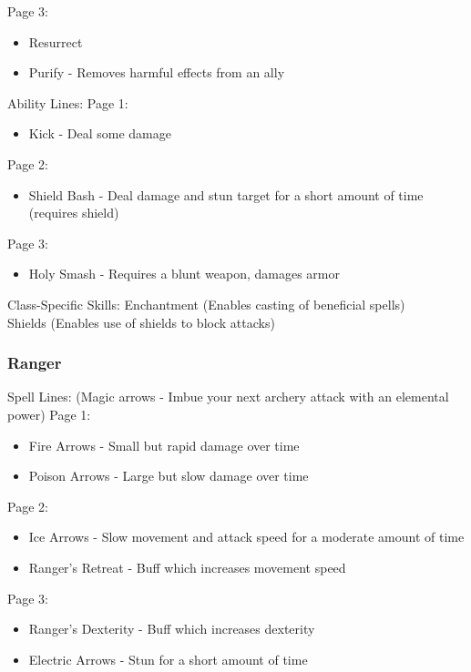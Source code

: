 \documentclass{article}
\begin{document}
Page 3:
\begin{itemize}
    \item Resurrect
    \item Purify - Removes harmful effects from an ally
\end{itemize}

Ability Lines:
Page 1:
\begin{itemize}
    \item Kick - Deal some damage
    
\end{itemize}

Page 2:
\begin{itemize}
    \item Shield Bash -  Deal damage and stun target for a short amount of time (requires shield)
    
\end{itemize}

Page 3:
\begin{itemize}
    \item Holy Smash - Requires a blunt weapon, damages armor
\end{itemize}

Class-Specific Skills:
Enchantment (Enables casting of beneficial spells)\\
Shields (Enables use of shields to block attacks)\\


\subsubsection{Ranger}
Spell Lines:
(Magic arrows - Imbue your next archery attack with an elemental power)
Page 1:
\begin{itemize}
    \item Fire Arrows - Small but rapid damage over time
    \item Poison Arrows - Large but slow damage over time
    
\end{itemize}

Page 2:
\begin{itemize}
    \item Ice Arrows - Slow movement and attack speed for a moderate amount of time
    \item Ranger's Retreat - Buff which increases movement speed
    
\end{itemize}

Page 3:
\begin{itemize}
    \item Ranger's Dexterity - Buff which increases dexterity
    \item Electric Arrows - Stun for a short amount of time
    
\end{itemize}
\end{document}
